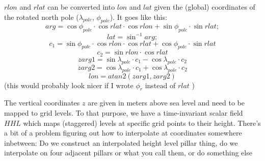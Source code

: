 $rlon$ and $rlat$ can be converted into $lon$ and $lat$ given the (global) coordinates of the rotated north pole ($\lambda_{pole}$, $\phi_{pole}$). It goes like this:
\begin{equation}
arg = \cos \phi_{pole} \cdot \cos rlat \cdot \cos rlon + \sin \phi_{pole} \cdot \sin rlat;
\end{equation}
\begin{equation}
		lat = \sin^{-1} arg;
\end{equation}
\begin{equation}
		c_1 = \sin \phi_{pole} \cdot \cos rlon \cdot \cos rlat + \cos \phi_{pole} \cdot \sin rlat
\end{equation}
\begin{equation}
		c_2 = \sin rlon \cdot \cos rlat
\end{equation}
\begin{equation}
		zarg1 = \sin \lambda_{pole} \cdot c_1 - \cos \lambda_{pole} \cdot c_2
\end{equation}
\begin{equation}
		zarg2 = \cos \lambda_{pole} \cdot c_1 + \cos \lambda_{pole} \cdot c_2
\end{equation}
\begin{equation}
		lon = atan2(zarg1,zarg2)
\end{equation}
(this would probably look nicer if I wrote $\phi_r$ instead of $rlat$ )

The vertical coordinates $z$ are given in meters above sea level and need to be mapped to grid levels. To that purpose, we have a time-invariant scalar field $HHL$ which maps (staggered) levels at specific grid points to their height. There's a bit of a problem figuring out how to interpolate at coordinates somewhere inbetween: Do we construct an interpolated height level pillar thing, do we interpolate on four adjacent pillars or what you call them, or do something else

